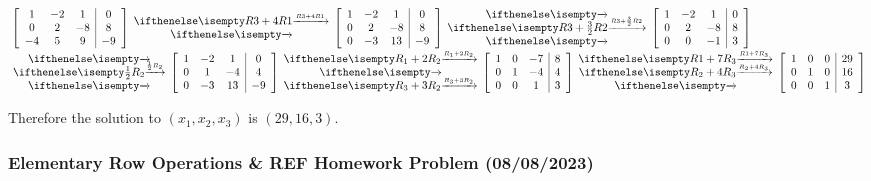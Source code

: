 \documentclass[
  letterpaper,
  DIV=11,
  numbers=noendperiod]{scrartcl}
\begin{document}

\begin{align*}
&\left[\begin{array}{ccc|c}
1 & -2 & 1 & 0 \\ 0 & 2 & -8 & 8 \\ -4 & 5 & 9 & -9
\end{array}\right]\rowops{R3+4R1,}\left[\begin{array}{ccc|c}1 & -2 & 1 & 0 \\ 0 & 2 & -8 & 8 \\ 0 & -3 & 13 & -9 \end{array}\right]\rowops{,R3+\frac{3}{2}R2,}\left[\begin{array}{ccc|c}1 & -2 & 1 & 0 \\ 0 & 2 & -8 & 8 \\ 0 & 0 & -1 & 3 \end{array}\right] \\
&\rowops{,\frac{1}{2}R_2,}
\left[\begin{array}{ccc|c}
1 & -2 & 1 & 0 \\ 0 & 1 & -4 & 4 \\ 0 & -3 & 13 & -9 
\end{array}\right] \rowops{R_1+2R_2,,R_3+3R_2}\left[\begin{array}{ccc|c}
1 & 0 & -7 & 8 \\ 0 & 1 & -4 & 4 \\ 0 & 0 & 1 & 3
\end{array}\right]\rowops{R1+7R_3,R_2+4R_3,}\left[\begin{array}{ccc|c}
1 & 0 & 0 & 29 \\ 0 & 1 & 0 & 16 \\ 0 & 0 & 1 & 3
\end{array}\right]
\end{align*}

Therefore the solution to \((x_1, x_2, x_3)\) is \((29, 16, 3)\).

\hypertarget{elementary-row-operations-ref-homework-problem-08082023}{%
\subsubsection{Elementary Row Operations \& REF Homework Problem
(08/08/2023)}\label{elementary-row-operations-ref-homework-problem-08082023}}

\end{document}
